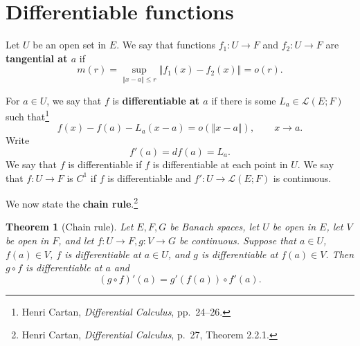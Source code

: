 \documentclass{article}
\newcommand{\norm}[1]{\left\Vert #1 \right\Vert}
\newtheorem{theorem}{Theorem}
\theoremstyle{definition}
\begin{document}
\section{Differentiable functions}
Let $U$ be an open set in $E$. We say that functions
$f_1:U \to F$ and $f_2:U \to F$ are \textbf{tangential at $a$} if 
\[
m(r) = \sup_{\norm{x-a} \leq r} \norm{f_1(x)-f_2(x)} = o(r).
\]





For $a \in U$,
we say that $f$ is \textbf{differentiable at $a$}
if there is some $L_a \in \mathscr{L}(E;F)$ such that\footnote{Henri Cartan, {\em Differential Calculus},
pp.~24--26.}
\[
f(x)-f(a) - L_a  (x-a) = o(\norm{x-a}),\qquad x \to a.
\]
Write
\[
 f'(a) =df(a) = L_a.
\]
We say that $f$ is differentiable if $f$ is differentiable at each point in $U$.
We say that $f:U \to F$ is $C^1$ if $f$ is differentiable and $f':U \to \mathscr{L}(E;F)$ is continuous.


We now state the \textbf{chain rule}.\footnote{Henri Cartan, {\em Differential Calculus},
p.~27, Theorem 2.2.1.}

\begin{theorem}[Chain rule]
Let $E,F,G$ be Banach spaces, let $U$ be open in $E$, let $V$ be open in $F$, and let
$f:U \to F, g:V \to G$ be continuous. Suppose that $a \in U$, $f(a) \in V$,  $f$ is differentiable
at $a \in U$, and $g$ is differentiable at $f(a) \in V$. Then $g \circ f$ is differentiable at $a$ and 
\[
(g \circ f)'(a) = g'(f(a)) \circ f'(a).
\]
\end{theorem}
\end{document}
